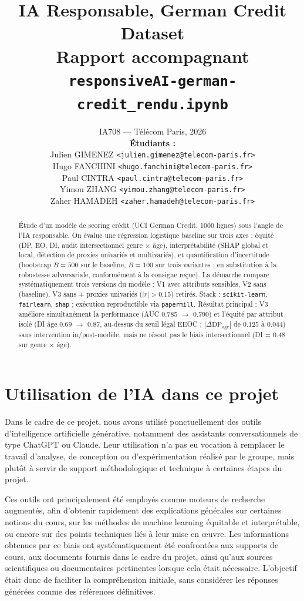 \documentclass[11pt, a4paper]{article}
\title{\textbf{IA Responsable, German Credit Dataset\\[0.3em]
\large Rapport accompagnant \texttt{responsiveAI-german-credit\_rendu.ipynb}}}
\author{%
IA708 --- Télécom Paris, 2026 \\[0.4em]
\normalsize \textbf{Étudiants :} \\
\normalsize Julien GIMENEZ \texttt{<julien.gimenez@telecom-paris.fr>} \\
\normalsize Hugo FANCHINI \texttt{<hugo.fanchini@telecom-paris.fr>} \\
\normalsize Paul CINTRA \texttt{<paul.cintra@telecom-paris.fr>} \\
\normalsize Yimou ZHANG \texttt{<yimou.zhang@telecom-paris.fr>} \\
\normalsize Zaher HAMADEH \texttt{<zaher.hamadeh@telecom-paris.fr>}
}
\date{}
\begin{document}
\maketitle
\vspace{-1em}

\begin{abstract}
\noindent Étude d'un modèle de scoring crédit (UCI German Credit, 1000 lignes) sous l'angle de l'IA responsable. On évalue une régression logistique baseline sur trois axes : équité (DP, EO, DI, audit intersectionnel genre $\times$ âge), interprétabilité (SHAP global et local, détection de proxies univariés et multivariés), et quantification d'incertitude (bootstrap $B = 500$ sur le baseline, $B = 100$ sur trois variantes ; en substitution à la robustesse adversariale, conformément à la consigne reçue). La démarche compare systématiquement trois versions du modèle : V1 avec attributs sensibles, V2 sans (baseline), V3 sans + proxies univariés ($|r| > 0.15$) retirés. Stack : \texttt{scikit-learn}, \texttt{fairlearn}, \texttt{shap} ; exécution reproductible via \texttt{papermill}. Résultat principal : V3 améliore simultanément la performance (AUC 0.785 $\to$ 0.790) et l'équité par attribut isolé (DI âge 0.69 $\to$ 0.87, au-dessus du seuil légal EEOC ; $|\Delta\text{DP}_{\text{age}}|$ de 0.125 à 0.044) sans intervention in/post-modèle, mais ne résout pas le biais intersectionnel (DI = 0.48 sur genre $\times$ âge).
\end{abstract}

\section*{Utilisation de l'IA dans ce projet}

Dans le cadre de ce projet, nous avons utilisé ponctuellement des outils d'intelligence artificielle générative, notamment des assistants conversationnels de type ChatGPT ou Claude. Leur utilisation n'a pas eu vocation à remplacer le travail d'analyse, de conception ou d'expérimentation réalisé par le groupe, mais plutôt à servir de support méthodologique et technique à certaines étapes du projet.

Ces outils ont principalement été employés comme moteurs de recherche augmentés, afin d'obtenir rapidement des explications générales sur certaines notions du cours, sur les méthodes de machine learning équitable et interprétable, ou encore sur des points techniques liés à leur mise en \oe uvre. Les informations obtenues par ce biais ont systématiquement été confrontées aux supports de cours, aux documents fournis dans le cadre du projet, ainsi qu'aux sources scientifiques ou documentaires pertinentes lorsque cela était nécessaire. L'objectif était donc de faciliter la compréhension initiale, sans considérer les réponses générées comme des références définitives.
\end{document}
